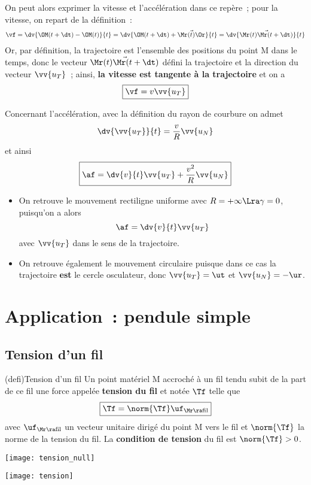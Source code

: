 \documentclass[../../main/main.tex]{subfiles}
\begin{document}
On peut alors exprimer la vitesse et l'accélération dans ce repère~; pour la
vitesse, on repart de la définition~:
\begin{gather*}
	\vf
	= \dv{\OM(t+\dt)-\OM(t)}{t}
	= \dv{\OM(t+\dt)+\vec{\Mr(t)\Or}}{t}
	= \dv{\vec{\Mr(t)\Mr(t+\dt)}}{t}
\end{gather*}
Or, par définition, la trajectoire est l'ensemble des positions du point M dans
le temps, donc le vecteur $\vec{\Mr(t)\Mr(t+\dt)}$ défini la trajectoire et la
direction du vecteur $\vv{u_T}$~; ainsi, \textbf{la vitesse est tangente à la
	trajectoire} et on a
\[
	\boxed{\vf = v\vv{u_T}}
\]

Concernant l'accélération, avec la définition du rayon de courbure on admet
\[ \dv{\vv{u_T}}{t} = \frac{v}{R}\vv{u_N}\]
et ainsi
\[
	\boxed{\af = \dv{v}{t}\vv{u_T} + \frac{v^2}{R}\vv{u_N}}
\]

\begin{itemize}
	\item On retrouve le mouvement rectiligne uniforme avec $R = +\infty \Lra
		      \gamma = 0$, puisqu'on a alors
	      \[\af = \dv{v}{t}\vv{u_T}\]
	      avec $\vv{u_T}$ dans le sens de la trajectoire.

	\item On retrouve également le mouvement circulaire puisque dans ce cas la
	      trajectoire \textbf{est} le cercle osculateur, donc $\vv{u_T} = \ut$ et
	      $\vv{u_N} = -\ur$.
\end{itemize}

\section{Application~: pendule simple}

\subsection{Tension d'un fil}
\begin{tcb*}(defi){Tension d'un fil}
	Un point matériel M accroché à un fil tendu subit de la part de ce fil une
	force appelée \textbf{tension du fil} et notée $\Tf$ telle que
	\[\boxed{\Tf = \norm{\Tf}\uf_{\Mr\ra\rm fil}}\]
	avec $\uf_{\Mr\ra\rm fil}$ un vecteur unitaire dirigé du point M vers le fil
	et $\norm{\Tf}$ la norme de la tension du fil. La \textbf{condition de
		tension} du fil est $\norm{\Tf} > 0$.

	\begin{minipage}{0.45\linewidth}
		\begin{center}
			\texttt{[image: tension\_null]}
		\end{center}
	\end{minipage}
	\hfill
	\begin{minipage}{0.45\linewidth}
		\begin{center}
			\texttt{[image: tension]}%
		\end{center}
	\end{minipage}
\end{tcb*}
\end{document}
